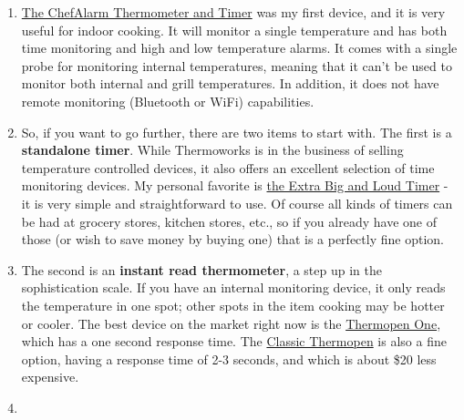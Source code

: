 \documentclass[
]{book}
\providecommand{\tightlist}{%
  \setlength{\itemsep}{0pt}\setlength{\parskip}{0pt}}
\begin{document}
\begin{enumerate}
\def\labelenumi{\arabic{enumi}.}
\tightlist
\item
  \href{https://www.thermoworks.com/chefalarm/}{The ChefAlarm Thermometer and Timer} was my first device, and it is very useful for indoor cooking. It will monitor a single temperature and has both time monitoring and high and low temperature alarms. It comes with a single probe for monitoring internal temperatures, meaning that it can't be used to monitor both internal and grill temperatures. In addition, it does not have remote monitoring (Bluetooth or WiFi) capabilities.\\
\item
  So, if you want to go further, there are two items to start with. The first is a \textbf{standalone timer}. While Thermoworks is in the business of selling temperature controlled devices, it also offers an excellent selection of time monitoring devices. My personal favorite is \href{https://www.thermoworks.com/extra-big-loud/}{the Extra Big and Loud Timer} - it is very simple and straightforward to use. Of course all kinds of timers can be had at grocery stores, kitchen stores, etc., so if you already have one of those (or wish to save money by buying one) that is a perfectly fine option.
\item
  The second is an \textbf{instant read thermometer}, a step up in the sophistication scale. If you have an internal monitoring device, it only reads the temperature in one spot; other spots in the item cooking may be hotter or cooler. The best device on the market right now is the \href{https://www.thermoworks.com/thermapen-one/}{Thermopen One}, which has a one second response time. The \href{https://www.thermoworks.com/classic-thermapen/}{Classic Thermopen} is also a fine option, having a response time of 2-3 seconds, and which is about \$20 less expensive.
\item

\end{enumerate}
\end{document}
